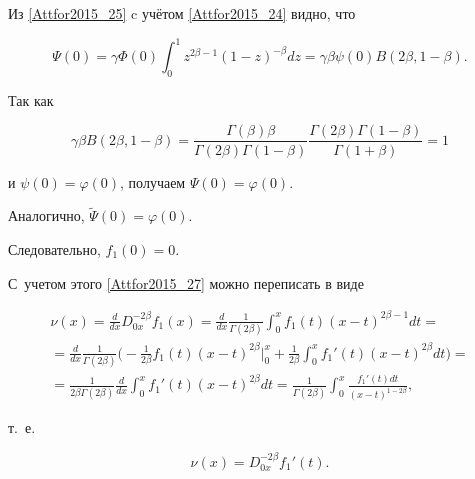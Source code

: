 Из \eqref{Attfor2015_25} c учётом \eqref{Attfor2015_24} видно, что

$$

\Psi(0)=\gamma\Phi(0) \int _0^1 z^{2\beta-1}(1-z)^{-\beta}dz=\gamma\beta\psi(0) B(2\beta , 1-\beta).

$$

Так как

$$

\gamma \beta B(2\beta , 1-\beta)=\frac{\Gamma(\beta)\beta}{\Gamma(2\beta)\Gamma(1-\beta)}

\frac{\Gamma(2\beta)\Gamma(1-\beta)}{\Gamma(1+\beta)}=1

$$

и $\psi(0)=\varphi(0)$, получаем $\Psi(0)=\varphi(0)$. 

Аналогично, $\widetilde{\Psi}(0)=\varphi(0)$.

Следовательно, $f_1(0)=0$. 

С~учетом этого \eqref{Attfor2015_27} можно переписать в виде

\begin{multline}

\nu(x)=\frac{d}{dx}D_{0x}^{-2\beta}f_1(x)=

\frac{d}{dx}\frac{1}{\Gamma(2\beta)} \int _0^x

f_1(t)(x-t)^{2\beta-1}dt=

\\

=\frac{d}{dx}\frac{1}{\Gamma(2\beta)}\biggl( 

-\frac{1}{2\beta} f_1(t)(x-t)^{2\beta}\Big|_0^x

+\frac{1}{2\beta} \int _0^x f_1'(t)(x-t)^{2\beta}dt

\biggr)=

\\

=\frac{1}{2\beta\Gamma(2\beta)}\frac{d}{dx} \int _0^x f_1'(t)(x-t)^{2\beta}dt=

\frac{1}{\Gamma(2\beta)} \int _0^x \frac{f_1'(t)dt}{(x-t)^{1-2\beta}},

\end{multline}

т.~е.

\begin{equation}

\label{Attfor2015_28}

\nu(x)=D_{0x}^{-2\beta}f_1'(t).

\end{equation}



